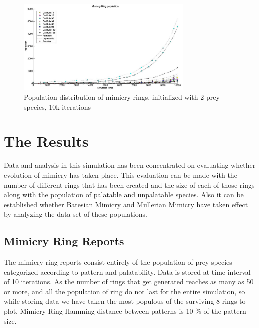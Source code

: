 \documentclass[letterpaper]{article}
\numberwithin{equation}{section}
\begin{document}
\begin{figure}[t!]
	\centering
	\includegraphics[width=0.75\textwidth]{images/simTime10k-2Prey}
	\caption[Population distribution of mimicry rings (2 prey species, 10k iterations)]{Population distribution of mimicry rings, initialized with 2 prey species, 10k iterations}
	\label{fig:plot-2-prey}
\end{figure}

\section{The Results}
\label{section:results}

Data and analysis in this simulation has been concentrated on evaluating whether evolution of mimicry has taken place. This evaluation can be made with the number of different rings that has been created and the size of each of those rings along with the population of palatable and unpalatable species. Also it can be established whether Batesian Mimicry and Mullerian Mimicry have taken effect by analyzing the data set of these populations.

\subsection{Mimicry Ring Reports}
The mimicry ring reports consist entirely of the population of prey species categorized according to pattern and palatability. Data is stored at time interval of 10 iterations. As the number of rings that get generated reaches as many as 50 or more, and all the population of ring do not last for the entire simulation, so while storing data we have taken the most populous of the surviving 8 rings to plot. Mimicry Ring Hamming distance between patterns is 10 \% of the pattern size.
\end{document}
